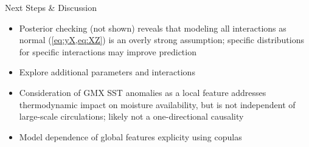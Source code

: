 \begin{block}{Next Steps \& Discussion}
    \begin{itemize}
        \item Posterior checking (not shown) reveals that modeling all interactions as normal (\cref{eq:yX,eq:XZ}) is an overly strong assumption; specific distributions for specific interactions may improve prediction
        \item Explore additional parameters and interactions
        \item Consideration of GMX SST anomalies as a local feature addresses thermodynamic impact on moisture availability, but is not independent of large-scale circulations; likely not a one-directional causality
        \item Model dependence of global features explicity using copulas \cite[\ie][]{Genest2007}
    \end{itemize}
\end{block}
